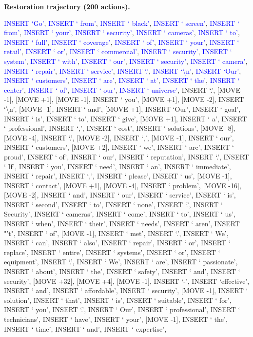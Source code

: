 \documentclass[11pt]{article}
\begin{document}
\vspace{0.4em}
\textbf{Restoration trajectory (200 actions).}\par
{
\ttfamily\scriptsize\raggedright\setlength{\parindent}{0pt}
\textcolor{blue}{INSERT `Go'}, \textcolor{blue}{INSERT ` from'}, \textcolor{blue}{INSERT ` black'}, \textcolor{blue}{INSERT ` screen'}, \textcolor{blue}{INSERT ` from'}, \textcolor{blue}{INSERT ` your'}, \textcolor{blue}{INSERT ` security'}, \textcolor{blue}{INSERT ` cameras'}, \textcolor{blue}{INSERT ` to'}, \textcolor{blue}{INSERT ` full'}, \textcolor{blue}{INSERT ` coverage'}, \textcolor{blue}{INSERT ` of'}, \textcolor{blue}{INSERT ` your'}, \textcolor{blue}{INSERT ` retail'}, \textcolor{blue}{INSERT ` or'}, \textcolor{blue}{INSERT ` commercial'}, \textcolor{blue}{INSERT ` security'}, \textcolor{blue}{INSERT ` system'}, \textcolor{blue}{INSERT ` with'}, \textcolor{blue}{INSERT ` our'}, \textcolor{blue}{INSERT ` security'}, \textcolor{blue}{INSERT ` camera'}, \textcolor{blue}{INSERT ` repair'}, \textcolor{blue}{INSERT ` service'}, \textcolor{blue}{INSERT `.'}, \textcolor{blue}{INSERT `\textbackslash{}n'}, \textcolor{blue}{INSERT `Our'}, \textcolor{blue}{INSERT ` customers'}, \textcolor{blue}{INSERT ` are'}, \textcolor{blue}{INSERT ` at'}, \textcolor{blue}{INSERT ` the'}, \textcolor{blue}{INSERT ` center'}, \textcolor{blue}{INSERT ` of'}, \textcolor{blue}{INSERT ` our'}, \textcolor{blue}{INSERT ` universe'}, INSERT `.', [MOVE -1], [MOVE +1], [MOVE -1], INSERT ` you', [MOVE +1], [MOVE -2], INSERT `\textbackslash{}n', [MOVE -1], INSERT ` and', [MOVE +1], INSERT `Our', INSERT ` goal', INSERT ` is', INSERT ` to', INSERT ` give', [MOVE +1], INSERT ` a', INSERT ` professional', INSERT `,', INSERT ` cost', INSERT ` solutions', [MOVE -8], [MOVE -4], INSERT `.', [MOVE -2], INSERT `,', [MOVE -1], INSERT ` our', INSERT ` customers', [MOVE +2], INSERT ` we', INSERT ` are', INSERT ` proud', INSERT ` of', INSERT ` our', INSERT ` reputation', INSERT `.', INSERT ` If', INSERT ` you', INSERT ` need', INSERT ` an', INSERT ` immediate', INSERT ` repair', INSERT `,', INSERT ` please', INSERT ` us', [MOVE -1], INSERT ` contact', [MOVE +1], [MOVE -4], INSERT ` problem', [MOVE -16], [MOVE -2], INSERT ` and', INSERT ` our', INSERT ` service', INSERT ` is', INSERT ` second', INSERT ` to', INSERT ` none', INSERT `.', INSERT ` Security', INSERT ` cameras', INSERT ` come', INSERT ` to', INSERT ` us', INSERT ` when', INSERT ` their', INSERT ` needs', INSERT ` aren', INSERT "'t", INSERT ` of', [MOVE -1], INSERT ` met', INSERT `.', INSERT ` We', INSERT ` can', INSERT ` also', INSERT ` repair', INSERT ` or', INSERT ` replace', INSERT ` entire', INSERT ` systems', INSERT ` or', INSERT ` equipment', INSERT `.', INSERT ` We', INSERT ` are', INSERT ` passionate', INSERT ` about', INSERT ` the', INSERT ` safety', INSERT ` and', INSERT ` security', [MOVE +32], [MOVE +4], [MOVE -1], INSERT `-', INSERT `effective', INSERT ` and', INSERT ` affordable', INSERT ` security', [MOVE -1], INSERT ` solution', INSERT ` that', INSERT ` is', INSERT ` suitable', INSERT ` for', INSERT ` you', INSERT `.', INSERT ` Our', INSERT ` professional', INSERT ` technicians', INSERT ` have', INSERT ` your', [MOVE -1], INSERT ` the', INSERT ` time', INSERT ` and', INSERT ` expertise', }
\end{document}
